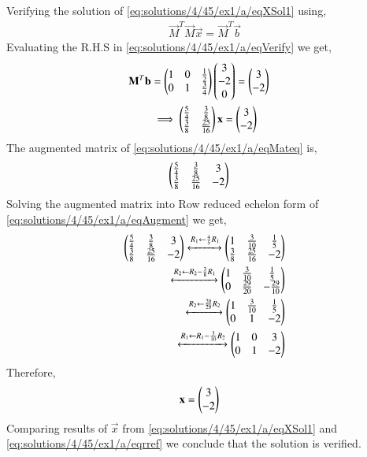 Verifying the solution of \eqref{eq:solutions/4/45/ex1/a/eqXSol1} using,
\begin{align}
\vec{M}^T\vec{M}\vec{x} = \vec{M}^T\vec{b}\label{eq:solutions/4/45/ex1/a/eqVerify}
\end{align}
Evaluating the R.H.S in \eqref{eq:solutions/4/45/ex1/a/eqVerify} we get,
\begin{align}
\mathbf{M}^T\mathbf{b} &= \begin{pmatrix}1&0&\frac{1}{2}\\0&1&\frac{3}{4}\end{pmatrix}\begin{pmatrix}3\\-2\\0\end{pmatrix}=\begin{pmatrix}3\\-2\end{pmatrix}\\
&\implies\begin{pmatrix}\frac{5}{4}&\frac{3}{8}\\\frac{3}{8}&\frac{25}{16}\end{pmatrix}\mathbf{x} = \begin{pmatrix}3\\-2\end{pmatrix}&\label{eq:solutions/4/45/ex1/a/eqMateq}
\end{align}
The augmented matrix of \eqref{eq:solutions/4/45/ex1/a/eqMateq} is,
\begin{align}
\begin{pmatrix}\frac{5}{4}&\frac{3}{8} &3\\\frac{3}{8}&\frac{25}{16}&-2\end{pmatrix} & \label{eq:solutions/4/45/ex1/a/eqAugment}
\end{align}
Solving the augmented matrix into Row reduced echelon form of \eqref{eq:solutions/4/45/ex1/a/eqAugment} we get,
\begin{align}
\begin{pmatrix}\frac{5}{4}&\frac{3}{8} &3\\\frac{3}{8}&\frac{25}{16}&-2\end{pmatrix}\xleftrightarrow[]{R_1\leftarrow\frac{4}{5}R_1}\begin{pmatrix}1&\frac{3}{10}&\frac{1}{5}\\\frac{3}{8}&\frac{25}{16}&-2\end{pmatrix}\\
\xleftrightarrow[]{R_2\leftarrow R_2-\frac{3}{8}R_1}\begin{pmatrix}1&\frac{3}{10}&\frac{1}{5}\\0&\frac{29}{20}&-\frac{29}{10}\end{pmatrix}\\
\xleftrightarrow[]{R_2\leftarrow \frac{20}{29}R_2}\begin{pmatrix}1&\frac{3}{10}&\frac{1}{5}\\0&1&-2\end{pmatrix}\\
\xleftrightarrow[]{R_1\leftarrow R_1-\frac{3}{10}R_2}\begin{pmatrix}1&0&3\\0&1&-2\end{pmatrix}
\end{align}
Therefore,
\begin{align}
   \mathbf{x}&=\begin{pmatrix}3\\-2\end{pmatrix}\label{eq:solutions/4/45/ex1/a/eqrref}
\end{align}
Comparing results of $\vec{x}$ from \eqref{eq:solutions/4/45/ex1/a/eqXSol1} and \eqref{eq:solutions/4/45/ex1/a/eqrref} we conclude that the solution is verified.
